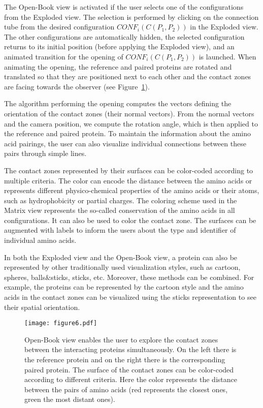 \documentclass[twocolumn]{bmcart}%
\def\OpBook {Open-Book view\xspace}
\def\ExpView {Exploded view\xspace}
\def\MatView {Matrix view\xspace}
\begin{document}
The \OpBook is activated if the user selects one of the configurations from the \ExpView. 
The selection is performed by clicking on the connection tube from the desired configuration $CONF_i(C(P_1,P_2))$ in the \ExpView.
The other configurations are automatically hidden, the selected configuration returns to its initial position (before applying the \ExpView), and an animated transition for the opening of $CONF_i(C(P_1,P_2))$ is launched.
When animating the opening, the reference and paired proteins are rotated and translated so that they are positioned next to each other and the contact zones are facing towards the observer (see Figure~\ref{fig:book}). 

The algorithm performing the opening computes the vectors defining the orientation of the contact zones (their normal vectors). 
From the normal vectors and the camera position, we compute the rotation angle, which is then applied to the reference and paired protein.
To maintain the information about the amino acid pairings, the user can also visualize individual connections between these pairs through simple lines.

The contact zones represented by their surfaces can be color-coded according to multiple criteria.
The color can encode the distance between the amino acids or represents different physico-chemical properties of the amino acids or their atoms, such as hydrophobicity or partial charges.
The coloring scheme used in the \MatView represents the so-called conservation of the amino acids in all configurations.
It can also be used to color the contact zone.
The surfaces can be augmented with labels to inform the users about the type and identifier of individual amino acids.

In both the \ExpView and the \OpBook, a protein can also be represented by other traditionally used visualization styles, such as cartoon, spheres, balls\&sticks, sticks, etc.
Moreover, these methods can be combined. 
For example, the proteins can be represented by the cartoon style and the amino acids in the contact zones can be visualized using the sticks representation to see their spatial orientation.

\begin{figure}[tb]
  \centering
  \texttt{[image: figure6.pdf]}
   \caption{\csentence{\OpBook.} \OpBook enables the user to explore the contact zones between the interacting proteins simultaneously. On the left there is the reference protein and on the right there is the corresponding paired protein. The surface of the contact zones can be color-coded according to different criteria. Here the color represents the distance between the pairs of amino acids (red represents the closest ones, green the most distant ones).}
  \label{fig:book}
\end{figure}
\end{document}
